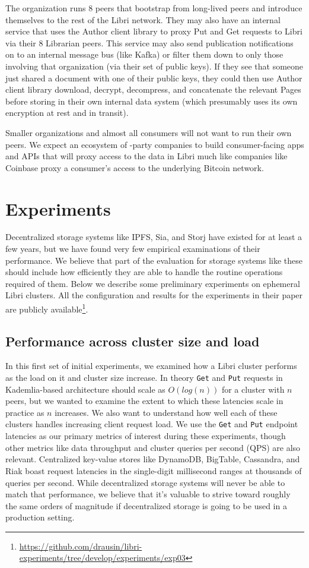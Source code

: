 \documentclass[10pt]{article}
\newcommand{\ttt}[1]{\texttt{#1}}
\begin{document}
The organization runs 8 peers that bootstrap from long-lived peers and introduce themselves to the rest of the Libri network. They may also have an internal service that uses the Author client library to proxy Put and Get requests to Libri via their 8 Librarian peers. This service may also send publication notifications on to an internal message bus (like Kafka) or filter them down to only those involving that organization (via their set of public keys). If they see that someone just shared a document with one of their public keys, they could then use Author client library download, decrypt, decompress, and concatenate the relevant Pages before storing in their own internal data system (which presumably uses its own encryption at rest and in transit).

Smaller organizations and almost all consumers will not want to run their own peers. We expect an ecosystem of -party companies to build consumer-facing apps and APIs that will proxy access to the data in Libri much like companies like Coinbase proxy a consumer's access to the underlying Bitcoin network.


\section{Experiments}
\label{sec:exps}
Decentralized storage systems like IPFS, Sia, and Storj have existed for at least a few years, but we have found very few empirical examinations of their performance. We believe that part of the evaluation for storage systems like these should include how efficiently they are able to handle the routine operations required of them. Below we describe some preliminary experiments on ephemeral Libri clusters. All the configuration and results for the experiments in their paper are publicly available\footnote{\url{https://github.com/drausin/libri-experiments/tree/develop/experiments/exp03}}.

\subsection{Performance across cluster size and load}

In this first set of initial experiments, we examined how a Libri cluster performs as the load on it and cluster size increase. In theory \ttt{Get} and \texttt{Put} requests in Kademlia-based architecture should scale as $O(log(n))$ for a cluster with $n$ peers, but we wanted to examine the extent to which these latencies scale in practice as $n$ increases. We also want to understand how well each of these clusters handles increasing client request load. We use the \texttt{Get} and \texttt{Put} endpoint latencies as our primary metrics of interest during these experiments, though other metrics like data throughput and cluster queries per second (QPS) are also relevant. Centralized key-value stores like DynamoDB, BigTable, Cassandra, and Riak boast request latencies in the single-digit millisecond ranges at thousands of queries per second. While decentralized storage systems will never be able to match that performance, we believe that it's valuable to strive toward roughly the same orders of magnitude if decentralized storage is going to be used in a production setting. 
\end{document}
